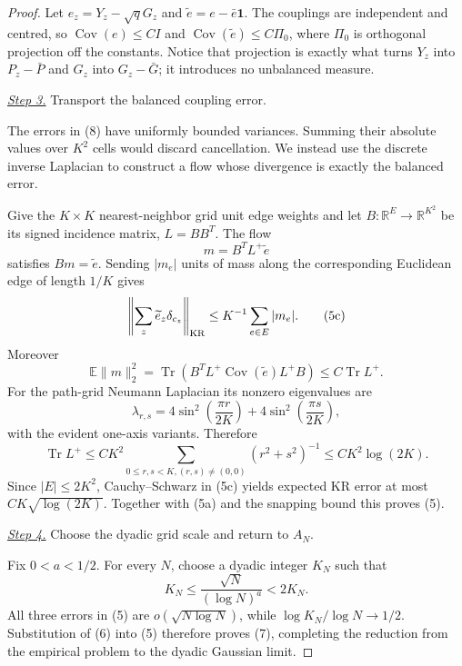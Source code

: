 \documentclass{aomart}
\theoremstyle{definition}
\newcommand{\1}{\mathbf 1}
\begin{document}
\begin{proof}
Let $e_ z=Y_ z-\sqrt qG_ z$ and
$\widetilde e=e-\bar e\mathbf1$.  The couplings are independent and
centred, so
$\operatorname {Cov}(e)\leq CI$ and
$\operatorname {Cov}(\widetilde e)\leq C\Pi_ 0$, where $\Pi_ 0$ is
orthogonal projection off the constants.  Notice that projection is
exactly what turns $Y_ z$ into $P_ z-\bar P$ and $G_ z$ into
$G_ z-\bar G$; it introduces no unbalanced measure.

\smallskip\noindent
\underline{\textit{Step 3.}} Transport the balanced coupling error.

The errors in (8) have uniformly bounded variances.  Summing their
absolute values over $K^2$ cells would discard cancellation.  We instead
use the discrete inverse Laplacian to construct a flow whose divergence
is exactly the balanced error.

Give
the $K\times K$ nearest-neighbor grid unit edge weights and let
$B:\mathbb R^E\to\mathbb R^{K^2}$ be its signed incidence matrix,
$L=BB^T$.  The flow
\begin{equation*}
m=B^TL^+\widetilde e
\end{equation*}
satisfies $Bm=\widetilde e$.  Sending $|m_ e|$ units of mass along
the corresponding Euclidean edge of length $1/K$ gives
\begin{equation}
\left\|\sum_ z\widetilde e_ z\delta_ {c_ z}\right\|_ {\rm KR}
\leq K^{-1}\sum_ {e\in E}|m_ e|.
\tag{5c}
\end{equation}
Moreover
\begin{equation*}
\mathbb E\|m\|_ 2^2
=\operatorname {Tr}\!\left(B^TL^+\operatorname {Cov}(\widetilde e)
L^+B\right)
\leq C\operatorname {Tr}L^+.
\end{equation*}
For the path-grid Neumann Laplacian its nonzero eigenvalues are
\begin{equation*}
\lambda_{r,s}=4\sin^2\!\left(\frac{\pi r}{2K}\right)+4\sin^2\!\left(\frac{\pi s}{2K}\right),
\end{equation*}
with the evident one-axis variants.  Therefore
\begin{equation}
\operatorname {Tr}L^+
\leq CK^2\sum_ {0\leq r,s<K,(r,s)\ne(0,0)}(r^2+s^2)^{-1}
\leq CK^2\log(2K).
\tag{5d}
\end{equation}
Since $|E|\leq2K^2$, Cauchy--Schwarz in (5c) yields expected KR error
at most $CK\sqrt{\log(2K)}$.  Together with (5a) and the snapping
bound this proves (5).

\smallskip\noindent
\underline{\textit{Step 4.}} Choose the dyadic grid scale and return to $A_N$.

Fix $0<a<1/2$. For every $N$, choose a dyadic integer $K_ N$ such
that
\begin{equation*}
K_ N\leq\frac{\sqrt N}{(\log N)^a}<2K_ N.
\end{equation*}
All three errors in (5) are $o(\sqrt{N\log N})$, while
$\log K_ N/\log N\to1/2$.  Substitution of (6) into (5) therefore
proves (7), completing the reduction from the empirical problem to the
dyadic Gaussian limit.

\end{proof}
\end{document}
